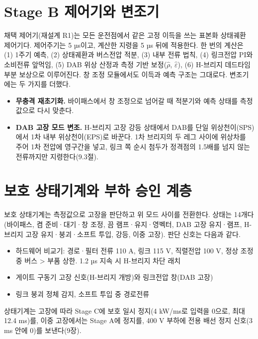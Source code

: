 \section{Stage B 제어기와 변조기}

채택 제어기(재설계 R1)는 모든 운전점에서 같은 고정 이득을 쓰는 표본화 상태궤환 제어기다. 제어주기는 5 µs이고, 계산한 지령을 5 µs 뒤에 적용한다. 한 번의 계산은 (1) 1주기 예측\cite{b7}, (2) 상태궤환과 버스전압 적분, (3) 내부 전류 법칙, (4) 링크전압 PI와 소비전류 앞먹임, (5) DAB 위상 산정과 측정 기반 보정($\hat{\rho}$, $\hat{\varepsilon}$), (6) H-브리지 데드타임 부분 보상으로 이루어진다. 창 조정 모듈에서도 이득과 예측 구조는 그대로다. 변조기에는 두 가지를 더했다.


\begin{itemize}
\item \textbf{무충격 재초기화.} 바이패스에서 창 조정으로 넘어갈 때 적분기와 예측 상태를 측정값으로 다시 맞춘다.
\item \textbf{DAB 고장 모드 변조.} H-브리지 고장 강등 상태에서 DAB를 단일 위상천이(SPS)에서 1차 내부 위상천이(EPS)\cite{b2}로 바꾼다. 1차 브리지의 두 레그 사이에 위상차를 주어 1차 전압에 영구간을 넣고, 링크 쪽 순시 첨두가 정격점의 1.5배를 넘지 않는 전류까지만 지령한다(9.3절).
\end{itemize}

\section{보호 상태기계와 부하 승인 계층}

보호 상태기계는 측정값으로 고장을 판단하고 위 모드 사이를 전환한다. 상태는 14개다(바이패스, 켬 준비·대기·창 조정, 끔 램프·유지·영벡터, DAB 고장 유지·램프, H-브리지 고장 유지·붕괴·소프트 투입, 강등, 이중 고장). 판단 신호는 다음과 같다.

\begin{itemize}
\item 하드웨어 비교기: 경로·필터 전류 110 A, 링크 115 V, 직렬전압 100 V, 정상 조정 중 버스 > 부품 상한. 1.2 µs 지속 시 H-브리지 차단 래치
\item 게이트 구동기 고장 신호(H-브리지 개방)와 링크전압 창(DAB 고장)
\item 링크 붕괴 정체 감지, 소프트 투입 중 경로전류
\end{itemize}

상태기계는 고장에 따라 Stage C에 보호 일시 정지(4 kW/ms로 입력을 0으로, 최대 12.4 ms)를, 이중 고장에서는 Stage A에 정지를, 400 V 부하에 전용 배선 정지 신호(3 ms 안에 0)를 보낸다(9장).

